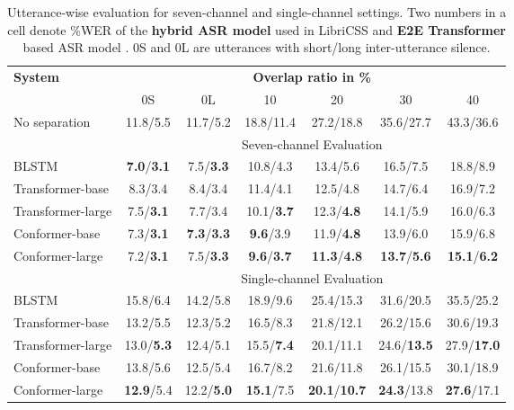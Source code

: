 \documentclass{article}
\begin{document}
	\begin{table*}[!t]
		\centering
		\caption{ Utterance-wise evaluation for seven-channel and single-channel settings. Two numbers in a cell denote \%WER of the \textbf{hybrid ASR model} used in LibriCSS \cite{chen2020continuous} and \textbf{E2E Transformer} based ASR model \cite{wang2019semantic}. 0S and 0L are utterances with short/long inter-utterance silence.}
		\label{tab:7ch_utt_result}
		
		\begin{tabular}{l|cccccc} 
			\toprule \hline
			\multirow{2}{*}{\textbf{System}} &
			\multicolumn{6}{c}{\textbf{Overlap ratio in \%}} \\ &
			0S & 0L & 10 & 20 & 30 & 40   \\ \hline
			No separation \cite{chen2020continuous} & 11.8/5.5 & 11.7/5.2 & 18.8/11.4 & 27.2/18.8 & 35.6/27.7 & 43.3/36.6 \\\hline
			&   \multicolumn{6}{c}{Seven-channel Evaluation} \\ 
			\hline
BLSTM & \textbf{7.0}/\textbf{3.1} & 7.5/\textbf{3.3} & 10.8/4.3 & 13.4/5.6 & 16.5/7.5 & 18.8/8.9 \\ 
Transformer-base & 8.3/3.4 & 8.4/3.4 & 11.4/4.1 & 12.5/4.8 & 14.7/6.4 & 16.9/7.2 \\					
			Transformer-large & 7.5/\textbf{3.1} &	7.7/3.4 &	10.1/\textbf{3.7} &	12.3/\textbf{4.8} &	14.1/5.9 &	16.0/6.3 \\
			
			Conformer-base & 7.3/\textbf{3.1} & \textbf{7.3}/\textbf{3.3} & \textbf{9.6}/3.9 & 11.9/\textbf{4.8} &	13.9/6.0 &	15.9/6.8 \\
			Conformer-large & 7.2/\textbf{3.1} & 7.5/\textbf{3.3} & \textbf{9.6}/\textbf{3.7} & \textbf{11.3}/\textbf{4.8} & \textbf{13.7}/\textbf{5.6} & \textbf{15.1}/\textbf{6.2} \\ \hline
			&   \multicolumn{6}{c}{Single-channel Evaluation}  \\ \hline
			
			BLSTM &  15.8/6.4 & 14.2/5.8 & 18.9/9.6 & 25.4/15.3 & 31.6/20.5 & 35.5/25.2 \\
			
Transformer-base & 13.2/5.5 & 12.3/5.2 & 16.5/8.3 & 21.8/12.1 & 26.2/15.6 & 30.6/19.3 \\
			Transformer-large & 13.0/\textbf{5.3} & 12.4/5.1 & 15.5/\textbf{7.4} & 20.1/11.1 & 24.6/\textbf{13.5} & 27.9/\textbf{17.0} \\
			
			Conformer-base & 13.8/5.6 & 12.5/5.4 & 16.7/8.2 & 21.6/11.8 & 26.1/15.5 & 30.1/18.9 \\
			Conformer-large & \textbf{12.9}/5.4 & 12.2/\textbf{5.0} & \textbf{15.1}/7.5 & \textbf{20.1}/\textbf{10.7} & \textbf{24.3}/13.8 & \textbf{27.6}/17.1 \\ \hline
			\bottomrule
		\end{tabular}
\end{table*}
\end{document}
